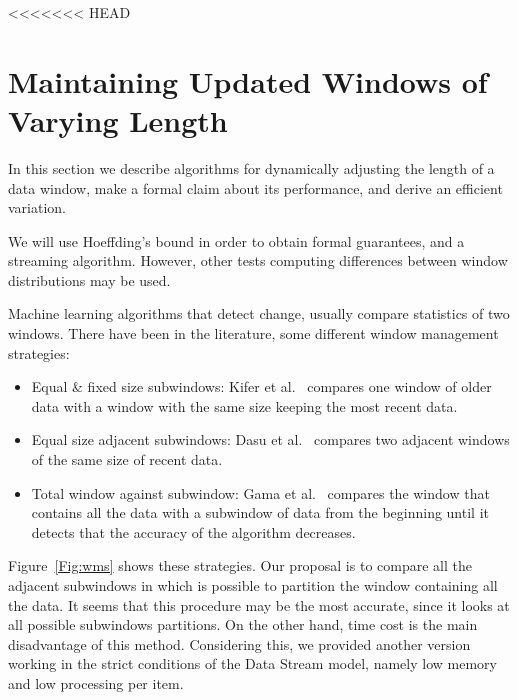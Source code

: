 <<<<<<< HEAD
%

\section{Maintaining Updated Windows of Varying Length}
\label{SMain}
In %
this section we describe algorithms 
for dynamically adjusting the length
of a data window, make a formal claim about its performance, and 
derive an efficient variation.

We will use Hoeffding's bound in order to obtain formal guarantees, and %
a streaming algorithm.
However, other tests computing differences between window distributions may be used.
 

\BEGINOMIT
Machine learning algorithms that detect change, usually compare statistics of two windows.
There have been in the literature, some different window management strategies:
\begin{itemize}
\item Equal \& fixed size subwindows: Kifer et al.~\cite{kifer-detecting} compares one window of older data with a window with the same size keeping the most recent data.
\item Equal size adjacent subwindows: Dasu et al.~\cite{Dasu} compares two adjacent windows of the same size of recent data.
\item Total window against subwindow: Gama et al.~\cite{Gama} compares the window that contains all the data with a subwindow of data from the beginning until it detects that the accuracy of the algorithm decreases.
\end{itemize}

Figure~\ref{Fig:wms} shows these strategies.
Our proposal is to compare all the adjacent subwindows in which is possible to partition the window containing all the data.
It seems that this procedure may be the most accurate, since it looks at all possible subwindows partitions. On the other hand, time cost is the main disadvantage of this method. Considering this, we provided another version working in the strict conditions of the Data Stream model, namely low
memory and low processing per item.

